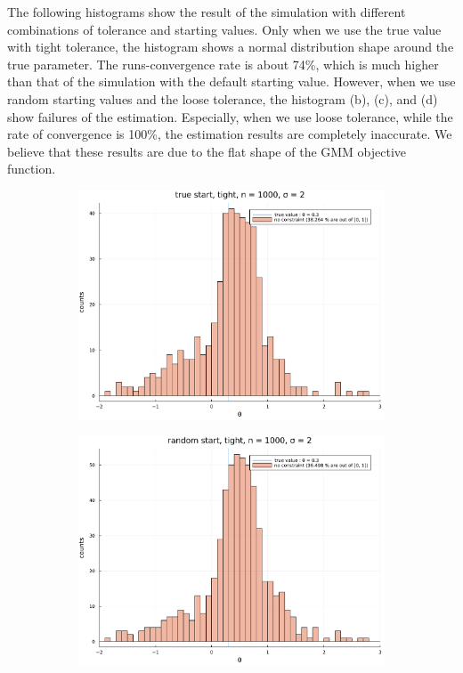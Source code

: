 \documentclass[11pt, a4paper]{article}
\begin{document}
The following histograms show the result of the simulation with different combinations of tolerance and starting values.
Only when we use the true value with tight tolerance, the histogram shows a 
normal distribution shape around the true parameter.
The runs-convergence rate is about 74\%, which is much higher than that of the simulation with the default starting value.
However, when we use random starting values and the loose tolerance, the histogram (b), (c), and (d) show failures of the estimation.
Especially, when we use loose tolerance, while the rate of convergence is 100\%, the estimation results are completely inaccurate.
We believe that these results are due to the flat shape of the GMM objective function.


\begin{figure}
    \centering
     \begin{subfigure}[b]{0.475\textwidth}
         \centering
         \includegraphics[width=\textwidth]{figuretable/tight/histogram_loglinear_loglinear_n_1000_sigma_2_non_constraint_true_start.pdf}
         \caption{}
     \end{subfigure}
     \hfill
     \begin{subfigure}[b]{0.475\textwidth}
         \centering
         \includegraphics[width=\textwidth]{figuretable/tight/histogram_loglinear_loglinear_n_1000_sigma_2_non_constraint_random_start.pdf}

\end{subfigure}
\end{figure}
\end{document}
